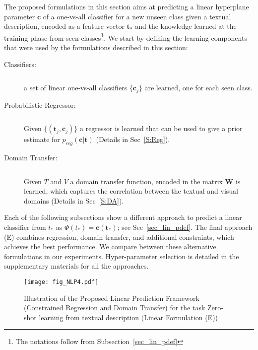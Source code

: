The proposed formulations in this section aims at predicting a linear hyperplane parameter $\mathbf{c}$ of a one-vs-all classifier for a new unseen class given a textual description, encoded as a feature vector $\mathbf{t_*}$ and the knowledge learned at the training phase from seen classes\footnote{The notations follow from Subsection~\ref{sec_lin_pdef}}. We start by  defining the learning components that were used by the formulations described in this section:

\begin{description}
\item [Classifiers:]$\,\,\,\,\,\,\,\,$ 

a set of linear one-vs-all classifiers $\{\mathbf{c}_j\}$ are learned, one for each seen class.
\item [Probabilistic Regressor:] $\,\,\,\,\,\,\,\,\,\,\,\,$

Given $\{(\mathbf{t}_j,\mathbf{c}_j)\}$ a regressor is learned that can be used to give a prior estimate for $p_{reg}(\mathbf{c} | \mathbf{t})$ (Details in Sec~\ref{S:Reg}).
\item [Domain Transfer:]$\,\,\,\,\,\,\,\,\,\,\,\,$ 

Given $T$ and $V$ a domain transfer function, encoded in the matrix $\mathbf{W}$ is learned, which captures the correlation between the textual and visual domains (Details in Sec~\ref{S:DA}).
\end{description} 
  
  
  
Each of the following subsections show a different approach to predict a linear classifier from $t_*$ as $\Phi(t_*) = \mathbf{c}(\textbf{t}_*)$; see Sec~\ref{sec_lin_pdef}. The final approach (E) combines  regression, domain transfer, and additional constraints, which achieves the best performance. We compare between these alternative formulations in our experiments. Hyper-parameter selection is detailed in the supplementary materials for all the approaches. %

\begin{figure*}[t]
\centering
\texttt{[image: fig\_NLP4.pdf]}
\vspace{-10pt}
\caption{Illustration of the Proposed Linear Prediction Framework (Constrained Regression and Domain Transfer) for the task Zero-shot learning from textual description (Linear Formulation (E))}
\label{F:prob_sol}
\vspace{-12pt}
\end{figure*}

